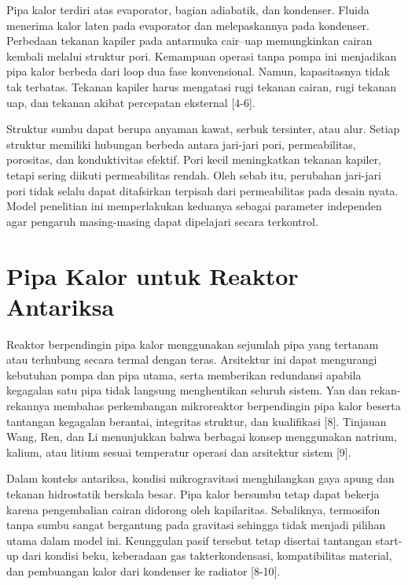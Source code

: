 \documentclass[
  12pt,
  12pt,a4paper,oneside]{report}
\begin{document}
Pipa kalor terdiri atas evaporator, bagian adiabatik, dan kondenser.
Fluida menerima kalor laten pada evaporator dan melepaskannya pada
kondenser. Perbedaan tekanan kapiler pada antarmuka cair--uap
memungkinkan cairan kembali melalui struktur pori. Kemampuan operasi
tanpa pompa ini menjadikan pipa kalor berbeda dari loop dua fase
konvensional. Namun, kapasitasnya tidak tak terbatas. Tekanan kapiler
harus mengatasi rugi tekanan cairan, rugi tekanan uap, dan tekanan
akibat percepatan eksternal {[}4-6{]}.

Struktur sumbu dapat berupa anyaman kawat, serbuk tersinter, atau alur.
Setiap struktur memiliki hubungan berbeda antara jari-jari pori,
permeabilitas, porositas, dan konduktivitas efektif. Pori kecil
meningkatkan tekanan kapiler, tetapi sering diikuti permeabilitas
rendah. Oleh sebab itu, perubahan jari-jari pori tidak selalu dapat
ditafsirkan terpisah dari permeabilitas pada desain nyata. Model
penelitian ini memperlakukan keduanya sebagai parameter independen agar
pengaruh masing-masing dapat dipelajari secara terkontrol.

\hypertarget{pipa-kalor-untuk-reaktor-antariksa}{%
\section{Pipa Kalor untuk Reaktor
Antariksa}\label{pipa-kalor-untuk-reaktor-antariksa}}

Reaktor berpendingin pipa kalor menggunakan sejumlah pipa yang tertanam
atau terhubung secara termal dengan teras. Arsitektur ini dapat
mengurangi kebutuhan pompa dan pipa utama, serta memberikan redundansi
apabila kegagalan satu pipa tidak langsung menghentikan seluruh sistem.
Yan dan rekan-rekannya membahas perkembangan mikroreaktor berpendingin
pipa kalor beserta tantangan kegagalan berantai, integritas struktur,
dan kualifikasi {[}8{]}. Tinjauan Wang, Ren, dan Li menunjukkan bahwa
berbagai konsep menggunakan natrium, kalium, atau litium sesuai
temperatur operasi dan arsitektur sistem {[}9{]}.

Dalam konteks antariksa, kondisi mikrogravitasi menghilangkan gaya apung
dan tekanan hidrostatik berskala besar. Pipa kalor bersumbu tetap dapat
bekerja karena pengembalian cairan didorong oleh kapilaritas.
Sebaliknya, termosifon tanpa sumbu sangat bergantung pada gravitasi
sehingga tidak menjadi pilihan utama dalam model ini. Keunggulan pasif
tersebut tetap disertai tantangan start-up dari kondisi beku, keberadaan
gas takterkondensasi, kompatibilitas material, dan pembuangan kalor dari
kondenser ke radiator {[}8-10{]}.
\end{document}
